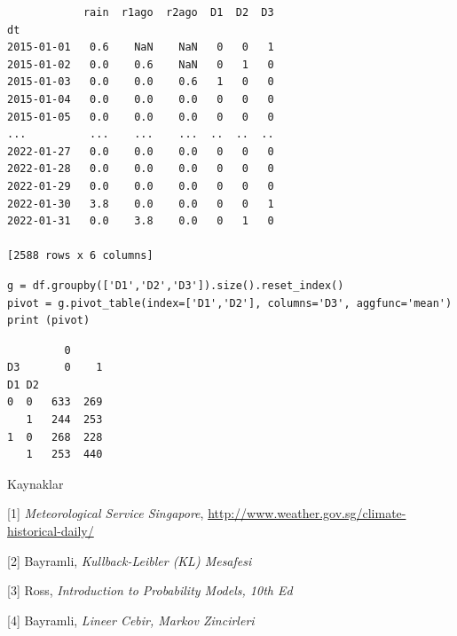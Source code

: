 \documentclass[12pt,fleqn]{article}\usepackage{../../common}
\begin{document}
\begin{verbatim}
            rain  r1ago  r2ago  D1  D2  D3
dt                                        
2015-01-01   0.6    NaN    NaN   0   0   1
2015-01-02   0.0    0.6    NaN   0   1   0
2015-01-03   0.0    0.0    0.6   1   0   0
2015-01-04   0.0    0.0    0.0   0   0   0
2015-01-05   0.0    0.0    0.0   0   0   0
...          ...    ...    ...  ..  ..  ..
2022-01-27   0.0    0.0    0.0   0   0   0
2022-01-28   0.0    0.0    0.0   0   0   0
2022-01-29   0.0    0.0    0.0   0   0   0
2022-01-30   3.8    0.0    0.0   0   0   1
2022-01-31   0.0    3.8    0.0   0   1   0

[2588 rows x 6 columns]
\end{verbatim}

\begin{verbatim}
g = df.groupby(['D1','D2','D3']).size().reset_index()
pivot = g.pivot_table(index=['D1','D2'], columns='D3', aggfunc='mean')
print (pivot)
\end{verbatim}

\begin{verbatim}
         0     
D3       0    1
D1 D2          
0  0   633  269
   1   244  253
1  0   268  228
   1   253  440
\end{verbatim}


Kaynaklar

[1] {\em Meteorological Service Singapore},
    \url{http://www.weather.gov.sg/climate-historical-daily/}

[2] Bayramli, {\em Kullback-Leibler (KL) Mesafesi}

[3] Ross, {\em Introduction to Probability Models, 10th Ed}

[4] Bayramli, {\em Lineer Cebir, Markov Zincirleri}
\end{document}
